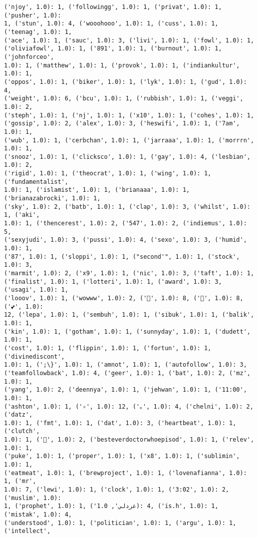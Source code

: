 \documentclass[11pt]{article}
\begin{document}
\begin{Verbatim}[commandchars=\\\{\}]
('njoy', 1.0): 1, ('followingg', 1.0): 1, ('privat', 1.0): 1, ('pusher', 1.0):
1, ('stun', 1.0): 4, ('wooohooo', 1.0): 1, ('cuss', 1.0): 1, ('teenag', 1.0): 1,
('ace', 1.0): 1, ('sauc', 1.0): 3, ('livi', 1.0): 1, ('fowl', 1.0): 1,
('oliviafowl', 1.0): 1, ('891', 1.0): 1, ('burnout', 1.0): 1, ('johnforceo',
1.0): 1, ('matthew', 1.0): 1, ('provok', 1.0): 1, ('indiankultur', 1.0): 1,
('oppos', 1.0): 1, ('biker', 1.0): 1, ('lyk', 1.0): 1, ('gud', 1.0): 4,
('weight', 1.0): 6, ('bcu', 1.0): 1, ('rubbish', 1.0): 1, ('veggi', 1.0): 2,
('steph', 1.0): 1, ('nj', 1.0): 1, ('x10', 1.0): 1, ('cohes', 1.0): 1,
('gossip', 1.0): 2, ('alex', 1.0): 3, ('heswifi', 1.0): 1, ('7am', 1.0): 1,
('wub', 1.0): 1, ('cerbchan', 1.0): 1, ('jarraaa', 1.0): 1, ('morrrn', 1.0): 1,
('snooz', 1.0): 1, ('clicksco', 1.0): 1, ('gay', 1.0): 4, ('lesbian', 1.0): 2,
('rigid', 1.0): 1, ('theocrat', 1.0): 1, ('wing', 1.0): 1, ('fundamentalist',
1.0): 1, ('islamist', 1.0): 1, ('brianaaa', 1.0): 1, ('brianazabrocki', 1.0): 1,
('sky', 1.0): 2, ('batb', 1.0): 1, ('clap', 1.0): 3, ('whilst', 1.0): 1, ('aki',
1.0): 1, ('thencerest', 1.0): 2, ('547', 1.0): 2, ('indiemus', 1.0): 5,
('sexyjudi', 1.0): 3, ('pussi', 1.0): 4, ('sexo', 1.0): 3, ('humid', 1.0): 1,
('87', 1.0): 1, ('sloppi', 1.0): 1, ("second'", 1.0): 1, ('stock', 1.0): 3,
('marmit', 1.0): 2, ('x9', 1.0): 1, ('nic', 1.0): 3, ('taft', 1.0): 1,
('finalist', 1.0): 1, ('lotteri', 1.0): 1, ('award', 1.0): 3, ('usagi', 1.0): 1,
('looov', 1.0): 1, ('wowww', 1.0): 2, ('💙', 1.0): 8, ('💚', 1.0): 8, ('💕', 1.0):
12, ('lepa', 1.0): 1, ('sembuh', 1.0): 1, ('sibuk', 1.0): 1, ('balik', 1.0): 1,
('kin', 1.0): 1, ('gotham', 1.0): 1, ('sunnyday', 1.0): 1, ('dudett', 1.0): 1,
('cost', 1.0): 1, ('flippin', 1.0): 1, ('fortun', 1.0): 1, ('divinediscont',
1.0): 1, (';\}', 1.0): 1, ('amnot', 1.0): 1, ('autofollow', 1.0): 3,
('teamfollowback', 1.0): 4, ('geer', 1.0): 1, ('bat', 1.0): 2, ('mz', 1.0): 1,
('yang', 1.0): 2, ('deennya', 1.0): 1, ('jehwan', 1.0): 1, ('11:00', 1.0): 1,
('ashton', 1.0): 1, ('✧', 1.0): 12, ('｡', 1.0): 4, ('chelni', 1.0): 2, ('datz',
1.0): 1, ('fmt', 1.0): 1, ('dat', 1.0): 3, ('heartbeat', 1.0): 1, ('clutch',
1.0): 1, ('🐢', 1.0): 2, ('besteverdoctorwhoepisod', 1.0): 1, ('relev', 1.0): 1,
('puke', 1.0): 1, ('proper', 1.0): 1, ('x8', 1.0): 1, ('sublimin', 1.0): 1,
('eatmeat', 1.0): 1, ('brewproject', 1.0): 1, ('lovenafianna', 1.0): 1, ('mr',
1.0): 7, ('lewi', 1.0): 1, ('clock', 1.0): 1, ('3:02', 1.0): 2, ('muslim', 1.0):
1, ('prophet', 1.0): 1, ('غردلي', 1.0): 4, ('is.h', 1.0): 1, ('mistak', 1.0): 4,
('understood', 1.0): 1, ('politician', 1.0): 1, ('argu', 1.0): 1, ('intellect',

\end{Verbatim}
\end{document}
